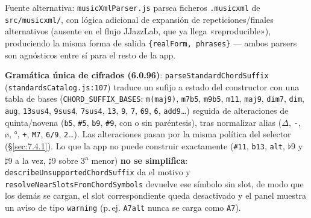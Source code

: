 \documentclass[a4paper,11pt,oneside]{report}
\newcommand{\Sref}[1]{\S\ref{#1}}
\newcommand{\flt}{\ensuremath{\flat}}
\newcommand{\shp}{\ensuremath{\sharp}}
\begin{document}
Fuente alternativa: \lstinline!musicXmlParser.js! parsea ficheros \lstinline!.musicxml! de \lstinline!src/musicxml/!, con lógica adicional de expansión de repeticiones/finales alternativos (ausente en el flujo JJazzLab, que ya llega «reproducible»), produciendo la misma forma de salida \lstinline!{realForm, phrases}! --- ambos parsers son agnósticos entre sí para el resto de la app.

\textbf{Gramática única de cifrados (6.0.96)}: \lstinline!parseStandardChordSuffix! (\lstinline!standardsCatalog.js:107!) traduce un sufijo a estado del constructor con una tabla de bases (\lstinline!CHORD_SUFFIX_BASES!: \lstinline!m(maj9)!, \lstinline!m7b5!, \lstinline!m9b5!, \lstinline!m11!, \lstinline!maj9!, \lstinline!dim7!, \lstinline!dim!, \lstinline!aug!, \lstinline!13sus4!, \lstinline!9sus4!, \lstinline!7sus4!, \lstinline!13!, \lstinline!9!, \lstinline!7!, \lstinline!69!, \lstinline!6!, \lstinline!add9!\ldots) seguida de alteraciones de quinta/novena (\lstinline!b5!, \lstinline!#5!, \lstinline!b9!, \lstinline!#9!, con o sin paréntesis), tras normalizar alias ($\Delta$, \lstinline!-!, ø, °, \lstinline!+!, \lstinline!M7!, \lstinline!6/9!, \lstinline!2!\ldots). Las alteraciones pasan por la misma política del selector (\Sref{sec:7.4.1}). Lo que la app no puede construir exactamente (\lstinline!#11!, \lstinline!b13!, \lstinline!alt!, \flt9 y \shp9 a la vez, \shp9 sobre 3\textsuperscript{a} menor) \textbf{no se simplifica}: \lstinline!describeUnsupportedChordSuffix! da el motivo y \lstinline!resolveNearSlotsFromChordSymbols! devuelve ese símbolo sin slot, de modo que los demás se cargan, el slot correspondiente queda desactivado y el panel muestra un aviso de tipo \lstinline!warning! (p.\,ej. \lstinline!A7alt! nunca se carga como \lstinline!A7!).
\end{document}
